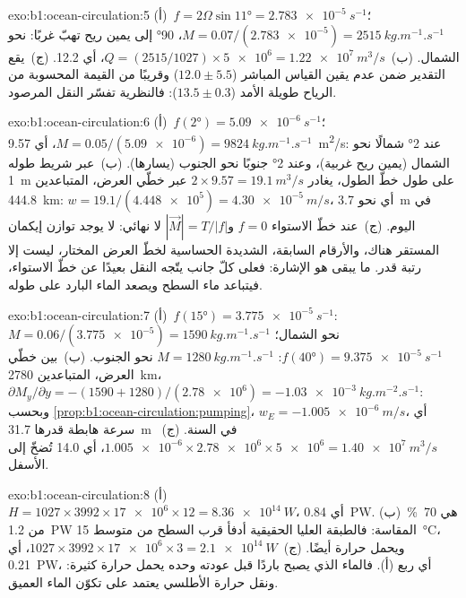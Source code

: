 \begin{solution}{exo:b1:ocean-circulation:5}
(أ)~$f = 2\Omega\sin\ang{11} = \qty{2.783e-5}{s^{-1}}$؛ $M = 0.07/(\num{2.783e-5}) =
\qty{2515}{kg.m^{-1}.s^{-1}}$، \ang{90} إلى يمين ريح تهبّ غربًا: نحو الشمال. (ب)~$Q = (2515/1027) \times \num{5e6} = \qty{1.22e7}{m^3/s}$، أي \qty{12.2}{\sverdrup}. (ج)~يقع التقدير ضمن عدم يقين القياس المباشر ($12.0 \pm 5.5$) وقريبًا من القيمة المحسوبة من الرياح طويلة الأمد ($13.5 \pm 0.3$): فالنظرية تفسّر النقل المرصود.
\end{solution}

\begin{solution}{exo:b1:ocean-circulation:6}
(أ)~$f(\ang{2}) = \qty{5.09e-6}{s^{-1}}$؛ $M = 0.05/(\num{5.09e-6}) =
\qty{9824}{kg.m^{-1}.s^{-1}}$، أي \qty{9.57}{m^2/s}: عند \ang{2} شمالًا نحو الشمال (يمين ريح غربية)، وعند \ang{2} جنوبًا نحو الجنوب (يسارها). (ب)~عبر شريط طوله \qty{1}{m} على طول خطّ الطول، يغادر $2 \times 9.57 = \qty{19.1}{m^3/s}$ عبر خطّي العرض، المتباعدين \qty{444.8}{km}: $w = 19.1/(\num{4.448e5}) = \qty{4.30e-5}{m/s}$، أي نحو \qty{3.7}{m} في اليوم. (ج)~عند خطّ الاستواء $f = 0$ و$|\vec M| = T/|f|$ لا نهائي: لا يوجد توازن إيكمان المستقر هناك، والأرقام السابقة، الشديدة الحساسية لخطّ العرض المختار، ليست إلا رتبة قدر. ما يبقى هو الإشارة: فعلى كلّ جانب يتّجه النقل بعيدًا عن خطّ الاستواء، فيتباعد ماء السطح ويصعد الماء البارد على طوله.
\end{solution}

\begin{solution}{exo:b1:ocean-circulation:7}
(أ)~$f(\ang{15}) = \qty{3.775e-5}{s^{-1}}$: $M = 0.06/(\num{3.775e-5}) =
\qty{1590}{kg.m^{-1}.s^{-1}}$ نحو الشمال؛ $f(\ang{40}) =
\qty{9.375e-5}{s^{-1}}$: $M = \qty{1280}{kg.m^{-1}.s^{-1}}$ نحو الجنوب.
(ب)~بين خطّي العرض، المتباعدين \qty{2780}{km}، $\partial M_y/\partial y =
-(1590 + 1280)/(\num{2.78e6}) = \qty{-1.03e-3}{kg.m^{-2}.s^{-1}}$: وبحسب \cref{prop:b1:ocean-circulation:pumping}، $w_E = \qty{-1.005e-6}{m/s}$، أي سرعة هابطة قدرها \qty{31.7}{m} في السنة. (ج)~$\num{1.005e-6} \times \num{2.78e6} \times
\num{5e6} = \qty{1.40e7}{m^3/s}$، أي \qty{14.0}{\sverdrup} تُضخّ إلى الأسفل.
\end{solution}

\begin{solution}{exo:b1:ocean-circulation:8}
(أ)~$H = 1027 \times 3992 \times \num{17e6} \times 12 = \qty{8.36e14}{W}$، أي \qty{0.84}{PW}. (ب)~هي \qty{70}{\percent} من \qty{1.2}{PW} المقاسة: فالطبقة العليا الحقيقية أدفأ قرب السطح من متوسط \qty{15}{\celsius}، ويحمل  حرارة أيضًا. (ج)~$1027 \times 3992 \times \num{17e6} \times 3 =
\qty{2.1e14}{W}$، أي \qty{0.21}{PW}، أي ربع (أ). فالماء الذي يصبح باردًا قبل عودته وحده يحمل حرارة كثيرة: ونقل حرارة الأطلسي يعتمد على تكوّن الماء العميق.
\end{solution}


